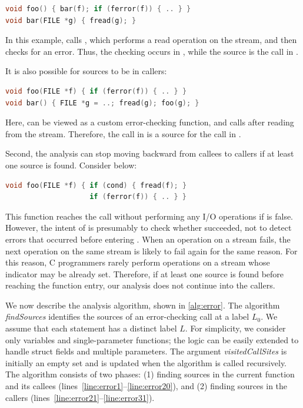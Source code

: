 \begin{lstlisting}[language=C]
void foo() { bar(f); if (ferror(f)) { .. } }
void bar(FILE *g) { fread(g); }
\end{lstlisting}

\noindent
%
In this example,  calls , which performs a read operation on the
stream, and then checks for an error.
%
Thus, the checking occurs in , while the source is the  call in
.

It is also possible for sources to be in callers:

\begin{lstlisting}[language=C]
void foo(FILE *f) { if (ferror(f)) { .. } }
void bar() { FILE *g = ..; fread(g); foo(g); }
\end{lstlisting}

\noindent
%
Here,  can be viewed as a custom error-checking function, and 
calls  after reading from the stream.
%
Therefore, the  call in  is a source for the  call in
.

Second, the analysis can stop moving backward from callees to callers if at
least one source is found.
%
Consider below:

\begin{lstlisting}[language=C]
void foo(FILE *f) { if (cond) { fread(f); }
                    if (ferror(f)) { .. } }
\end{lstlisting}

\noindent
%
This function reaches the  call without performing any I/O operations
if  is false.
%
However, the intent of  is presumably to check whether 
succeeded, not to detect errors that occurred before entering .
%
When an operation on a stream fails, the next operation on the same stream is
likely to fail again for the same reason.
%
For this reason, C programmers rarely perform operations on a stream whose
indicator may be already set.
%
Therefore, if at least one source is found before reaching the function entry,
our analysis does not continue into the callers.

We now describe the analysis algorithm, shown in \cref{alg:error}.
%
The algorithm \textit{findSources} identifies the sources of an error-checking
call at a label $L_0$.
%
We assume that each statement has a distinct label $L$.
%
For simplicity, we consider only variables and single-parameter functions;
%
the logic can be easily extended to handle struct fields and multiple
parameters.
%
The argument \textit{visitedCallSites} is initially an empty set and is updated
when the algorithm is called recursively.
%
The algorithm consists of two phases:
%
(1) finding sources in the current function and its callees
(lines~\ref{line:error1}--\ref{line:error20}), and
%
(2) finding sources in the callers
(lines~\ref{line:error21}--\ref{line:error31}).

